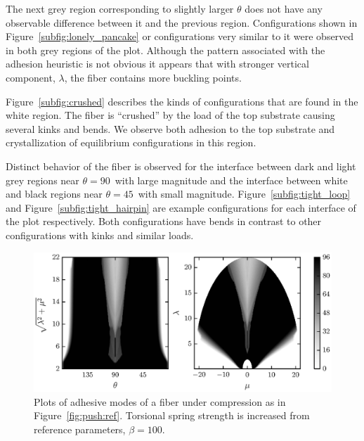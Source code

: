 The next grey region corresponding to slightly larger $\theta$ does not have any observable difference between it and the previous region. Configurations shown in Figure~\ref{subfig:lonely_pancake} or configurations very similar to it were observed in both grey regions of the plot. Although the pattern associated with the adhesion heuristic is not obvious it appears that with stronger vertical component, $\lambda$, the fiber contains more buckling points.

Figure~\ref{subfig:crushed} describes the kinds of configurations that are found in the white region. The fiber is ``crushed'' by the load of the top substrate causing several kinks and bends. We observe both adhesion to the top substrate and crystallization of equilibrium configurations in this region. 

Distinct behavior of the fiber is observed for the interface between dark and light grey regions near $\theta=90$\textdegree\ with large magnitude and the interface between white and black regions near $\theta=45$\textdegree\ with small magnitude. Figure~\ref{subfig:tight_loop} and Figure~\ref{subfig:tight_hairpin} are example configurations for each interface of the plot respectively. Both configurations have bends in contrast to other configurations with kinks and similar loads.

	\begin{figure}[t]
		\begin{center}
			\includegraphics{./fig/ch3/push/b100/grid.eps}
		\end{center}		
		\caption{Plots of adhesive modes of a fiber under compression as in Figure~\ref{fig:push:ref}. Torsional spring strength is increased from reference parameters, $\beta=100$.
		\label{fig:push:b100}}
	\end{figure}	
	
